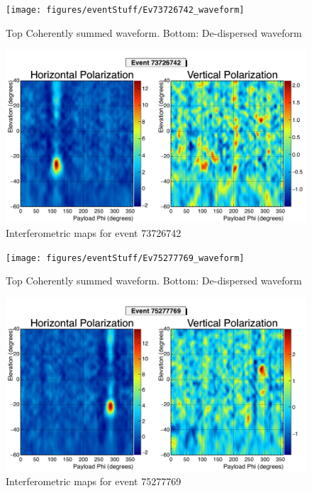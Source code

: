 		\begin{figure}
		\centering
			\texttt{[image: figures/eventStuff/Ev73726742\_waveform]}
			\caption{Top Coherently summed waveform.  Bottom: De-dispersed waveform} 
		\label{fig:Ev73726742_waveform}
		\end{figure}
		
		\begin{figure}
		\centering
			\includegraphics[width=\textwidth]{figures/intMap/intMap_ev73726742}
			\caption{Interferometric maps for event 73726742} 
		\label{fig:Ev73726742_map}
		\end{figure}			
	
		\begin{figure}
		\centering
			\texttt{[image: figures/eventStuff/Ev75277769\_waveform]}
			\caption{Top Coherently summed waveform.  Bottom: De-dispersed waveform} 
		\label{fig:Ev75277769_waveform}
		\end{figure}
		
		\begin{figure}
		\centering
			\includegraphics[width=\textwidth]{figures/intMap/intMap_ev75277769}
			\caption{Interferometric maps for event 75277769} 
		\label{fig:Ev75277769_map}
		\end{figure}			
	
